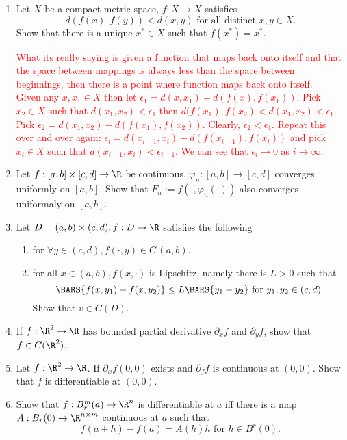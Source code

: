 \documentclass[10pt,a4paper]{report}
\newcommand{\RED}[1]{\textcolor{red}{#1}}
\begin{document}
\begin{enumerate}
\item Let $X$ be a compact metric space, $f: X \to X$ satisfies $$ d(f(x), f(y)) < d(x,y) \text{ for all distinct } x,y \in X.$$  Show that there is a unique $x^* \in X$ such that $f(x^*)=x^*$.

\RED{What its really saying is given a function that maps back onto itself and that the space between mappings is always less than the space between beginnings, then there is a point where function maps back onto itself.\\
Given any $x,x_1 \in X$ then let $\epsilon_1 = d(x,x_1) - d(f(x), f(x_1))$.  Pick $x_2\in X$ such that $d(x_1,x_2) <\epsilon_1$ then $d(f(x_1), f(x_2)< d(x_1,x_2) <\epsilon_1$.  Pick $\epsilon_2 = d(x_1, x_2) - d(f(x_1), f(x_2))$.  Clearly, $\epsilon_2 < \epsilon_1$.  Repeat this over and over again: $\epsilon_i = d(x_{i-1},x_i) -d(f(x_{i-1}),f(x_i))$ and pick $x_i\in X$ such that $d(x_{i-1}, x_i) < \epsilon_{i-1}$.  We can see that $\epsilon_i \to 0$ as $i\to \infty$.
}

\item Let $f:[a,b]\times [c,d] \to \R$ be continuous, $\varphi_n:[a,b]\to [c,d]$ converges uniformly on $[a,b]$.  Show that $F_n := f(\cdot, \varphi_n(\cdot))$ also converges uniformaly on $[a,b]$.

\item Let $D=(a,b)\times(c,d), f: D \to \R$ satisfies  the following
\begin{enumerate}
	\item for $\forall y \in (c,d), f(\cdot,y) \in C\, (a,b)$.
	\item for all $x\in (a,b), f(x, \cdot)$ is Lipschitz, namely there is $L > 0$ such that $$ \BARS{f(x,y_1)-f(x,y_2)}\le L\BARS{y_1 - y_2}\text{ for } y_1,y_2 \in (c,d)$$Show that $v \in C(D)$.
\end{enumerate}

\item If $f : \R^2 \to \R$ has bounded partial derivative $\partial_x f$ and $\partial_y f$, show that $f \in C(\R^2)$.

\item Let $f: \R^2 \to \R$.  If $\partial_x f(0,0)$ exists and $\partial_f f$ is continuous at $(0,0)$.  Show that $f$ is differentiable at $(0,0)$.

\item Show that $f: B_r^m(a) \to \R^n$ is differentiable at $a$ iff there is a map $A:B_r(0)\to \R^{n\times m}$ continuous at $a$ such that $$f(a+h)-f(a)=A(h)h\text{ for } h\in B^r(0).$$


\end{enumerate}
\end{document}
